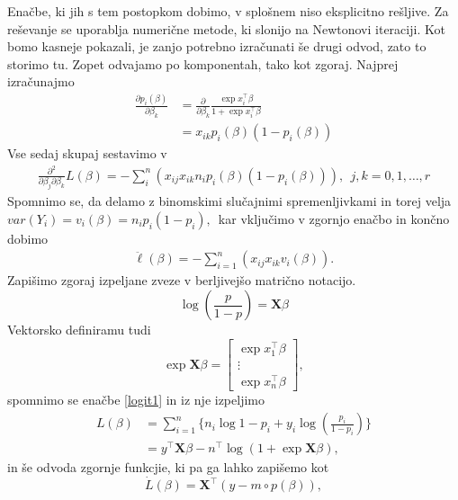 \documentclass[12pt,a4paper]{amsart}
\theoremstyle{definition} %
\theoremstyle{plain} %
\begin{document}
Enačbe, ki jih s tem postopkom dobimo, v splošnem niso eksplicitno rešljive. Za reševanje se uporablja numerične metode, ki slonijo na Newtonovi iteraciji. Kot
bomo kasneje pokazali, je zanjo potrebno izračunati še drugi odvod, zato to storimo tu. Zopet odvajamo po komponentah, tako kot zgoraj. Najprej izračunajmo
\begin{align}
    \frac{\partial p_{i}(\beta)}{\partial \beta_{k}} &= \frac{\partial}{\partial \beta_{k}} \frac{\exp{x_{i}^\top\beta}}{1+\exp{x_{i}^\top\beta}} \nonumber \\
        &= x_{ik}p_{i}(\beta)(1 - p_{i}(\beta)) \nonumber
\end{align}
Vse sedaj skupaj sestavimo v
\begin{align}
    \frac{\partial^2}{\partial \beta_{j}\partial\beta_{k}} L(\beta)= - \sum_{i}^{n}\left(x_{ij}x_{ik}n_{i}p_{i}(\beta)(1-p_{i}(\beta))\right),~~j,k = 0,1,\ldots, r
\end{align}
Spomnimo se, da delamo z binomskimi slučajnimi spremenljivkami in torej velja $var(Y_{i}) = v_{i}(\beta) = n_{i}p_{i}(1-p_{i}),$~kar vključimo v zgornjo enačbo in končno dobimo
\begin{align}
    \ddot{\ell}(\beta) = -\sum_{i=1}^{n}\left(x_{ij}x_{ik}v_{i}(\beta)\right).
\end{align}
Zapišimo zgoraj izpeljane zveze v berljivejšo matrično notacijo. 
\begin{equation*}
    \log \left(\frac{p}{1-p}\right) = \mathbf{X}\beta
\end{equation*}
Vektorsko definiramu tudi
\[
    \exp{\mathbf{X}\beta} = \begin{bmatrix}
                            \exp{x_{1}^\top\beta} \\
                            \vdots\\
                            \exp{x_{n}^\top\beta}
                            \end{bmatrix},
\]
spomnimo se enačbe \eqref{logit1} in iz nje izpeljimo %
\begin{align} \label{ell}
    L(\beta) &= \sum_{i=1}^{n}\{n_{i}\log{1-p_{i}}  + y_{i}\log{\left(\frac{p_{i}}{1-p_{i}}\right)}\} \nonumber\\
    &= y^\top\mathbf{X}\beta - n^\top \log(1 + \exp{\mathbf{X}\beta}),
\end{align}
in še odvoda zgornje funkcjie, ki pa ga lahko zapišemo kot
\begin{equation}
    \dot{L}(\beta) = \mathbf{X}^\top(y - m\circ p(\beta)),
\end{equation}
\end{document}
